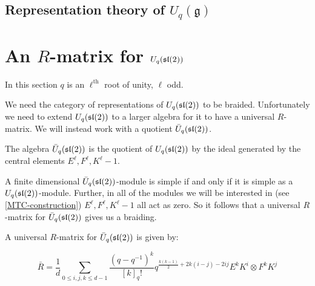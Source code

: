     \subsection{Representation theory of $U_q(\mathfrak{g})$}

\section{An $R$-matrix for $U_q(\mathfrak{sl}(2))$}
    
In this section $q$ is an $\ell^\text{th}$ root of unity, $\ell$ odd.

We need the category of representations of $U_q(\mathfrak{sl}(2))$ to be braided.
Unfortunately we need to extend $U_q(\mathfrak{sl}(2))$ to a larger algebra for it to
have a universal $R$-matrix. We will instead work with a quotient
$\bar{U}_{q}(\mathfrak{sl}(2))$.

\begin{defn}
    The algebra $\bar{U}_q(\mathfrak{sl}(2))$ is the quotient of $U_q(\mathfrak{sl}(2))$ by the
    ideal generated by the central elements $ E^\ell, F^\ell, K^\ell-1$.
\end{defn}

A finite dimensional $\bar{U}_q(\mathfrak{sl}(2))$-module is simple if and only if it is
simple as a $U_q(\mathfrak{sl}(2))$-module. Further, in all of the modules we will be
interested in (see \ref{MTC-construction}) $E^\ell, F^\ell, K^{\ell}-1$ all act
as zero. So it follows that a universal $R$-matrix for $\bar{U}_q(\mathfrak{sl}(2))$
gives us a braiding. %


A universal $R$-matrix for $\bar{U}_q(\mathfrak{sl}(2))$ is given by: %


\begin{equation}
    \bar{R} = \frac{1}{d} \sum_{0 \leq i,j,k\leq d-1} \frac{(q-q^{-1})^k}{[k]_q!} q^{\frac{k(k-1)}{2} + 2k(i-j) - 2ij} E^k K^i \otimes F^k K^j
\end{equation}
